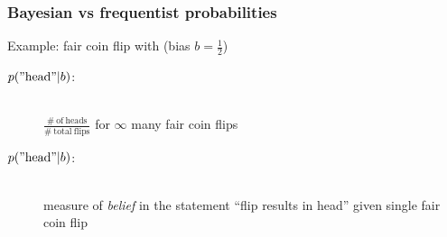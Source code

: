\documentclass[t,aspectratio=169]{beamer}
\begin{document}
\begin{frame}
  \frametitle{Bayesian vs frequentist probabilities}
  Example: fair coin flip with (bias $b=\frac{1}{2}$)%
    \begin{tcolorbox}[title=Frequentist probability]
    \begin{description}
    \item[$p(\mathrm{"head"}|b)$:] \hfill \\ $\frac{\mathrm{\# \ of \ heads}}{\mathrm{\# \ total \ flips}}$ for $\infty$ many fair coin flips
    \end{description}
  \end{tcolorbox}
  \begin{tcolorbox}[title=Bayesian probability]
    \begin{description}
    \item[$p(\mathrm{"head"}|b)$:] \hfill \\ measure of \textit{belief} in the statement ``flip results in head'' given single fair coin flip
    \end{description}
  \end{tcolorbox}
\end{frame}
\end{document}
